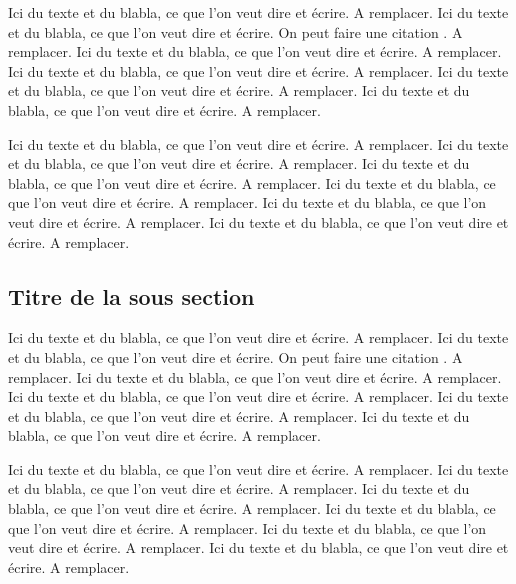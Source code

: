 Ici du texte et du blabla, ce que l'on veut dire et écrire. A remplacer. Ici du texte et du blabla, ce que l'on veut dire et écrire. On peut faire une citation \cite{Motclef1}.
A remplacer. Ici du texte et du blabla, ce que l'on veut dire et écrire. A remplacer. Ici du texte et du blabla, ce que l'on veut dire et écrire. A remplacer. Ici du texte et du blabla, ce que l'on veut dire et écrire. A remplacer. Ici du texte et du blabla, ce que l'on veut dire et écrire. A remplacer.

Ici du texte et du blabla, ce que l'on veut dire et écrire. A remplacer. Ici du texte et du blabla, ce que l'on veut dire et écrire. A remplacer.
Ici du texte et du blabla, ce que l'on veut dire et écrire. A remplacer. Ici du texte et du blabla, ce que l'on veut dire et écrire. A remplacer. Ici du texte et du blabla, ce que l'on veut dire et écrire. A remplacer. Ici du texte et du blabla, ce que l'on veut dire et écrire. A remplacer.

\subsection{Titre de la sous section}

Ici du texte et du blabla, ce que l'on veut dire et écrire. A remplacer. Ici du texte et du blabla, ce que l'on veut dire et écrire. On peut faire une citation \cite{Motclef1}.
A remplacer. Ici du texte et du blabla, ce que l'on veut dire et écrire. A remplacer. Ici du texte et du blabla, ce que l'on veut dire et écrire. A remplacer. Ici du texte et du blabla, ce que l'on veut dire et écrire. A remplacer. Ici du texte et du blabla, ce que l'on veut dire et écrire. A remplacer.

Ici du texte et du blabla, ce que l'on veut dire et écrire. A remplacer. Ici du texte et du blabla, ce que l'on veut dire et écrire. A remplacer.
Ici du texte et du blabla, ce que l'on veut dire et écrire. A remplacer. Ici du texte et du blabla, ce que l'on veut dire et écrire. A remplacer. Ici du texte et du blabla, ce que l'on veut dire et écrire. A remplacer. Ici du texte et du blabla, ce que l'on veut dire et écrire. A remplacer.

\clearpage
